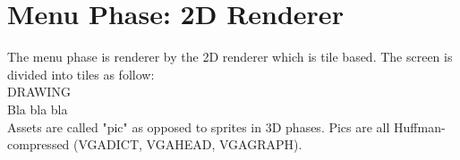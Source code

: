 \section{Menu Phase: 2D Renderer}
The menu phase is renderer by the 2D renderer which is tile based. The screen is divided into tiles as follow:\\
DRAWING\\
Bla bla bla\\
Assets are called "pic" as opposed to sprites in 3D phases. Pics  are all Huffman-compressed (VGADICT, VGAHEAD, 
VGAGRAPH).


